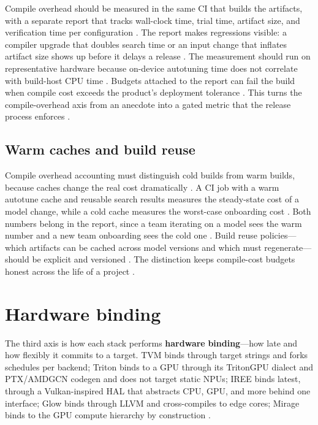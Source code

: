 Compile overhead should be measured in the same CI that builds the artifacts, with a separate report that tracks wall-clock time, trial time, artifact size, and verification time per configuration \citep{chen2020compilerbasedhardw,memoryfloor2026}. The report makes regressions visible: a compiler upgrade that doubles search time or an input change that inflates artifact size shows up before it delays a release \citep{patel2025llminference,taxbreak2026}. The measurement should run on representative hardware because on-device autotuning time does not correlate with build-host CPU time \citep{zheng2020ansor,tritonlang2024}. Budgets attached to the report can fail the build when compile cost exceeds the product's deployment tolerance \citep{memoryfloor2026,patel2025llminference}. This turns the compile-overhead axis from an anecdote into a gated metric that the release process enforces \citep{chen2020compilerbasedhardw,taxbreak2026}.

\subsection{Warm caches and build reuse}

Compile overhead accounting must distinguish cold builds from warm builds, because caches change the real cost dramatically \citep{chen2020compilerbasedhardw,tritonlang2024}. A CI job with a warm autotune cache and reusable search results measures the steady-state cost of a model change, while a cold cache measures the worst-case onboarding cost \citep{zheng2020ansor,wu2024mirage}. Both numbers belong in the report, since a team iterating on a model sees the warm number and a new team onboarding sees the cold one \citep{patel2025llminference,memoryfloor2026}. Build reuse policies—which artifacts can be cached across model versions and which must regenerate—should be explicit and versioned \citep{wu2024mirage,taxbreak2026}. The distinction keeps compile-cost budgets honest across the life of a project \citep{memoryfloor2026,chen2020compilerbasedhardw}.

\section{Hardware binding}
\label{sec:ch21_hw_binding}

The third axis is how each stack performs \textbf{hardware} \textbf{binding}---how late and how flexibly it commits to a target. TVM binds through target strings and forks schedules per backend; Triton binds to a GPU through its TritonGPU dialect and PTX/AMDGCN codegen and does not target static NPUs; IREE binds latest, through a Vulkan-inspired HAL that abstracts CPU, GPU, and more behind one interface; Glow binds through LLVM and cross-compiles to edge cores; Mirage binds to the GPU compute hierarchy by construction \citep{chen2018tvm,tritonlang2024,iree2024,rotem2018glow,wu2024mirage}.

